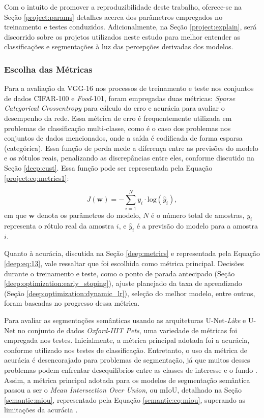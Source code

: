 Com o intuito de promover a reproduzibilidade deste trabalho, oferece-se na Seção \ref{project:params} detalhes acerca dos parâmetros empregados no treinamento e testes conduzidos. Adicionalmente, na Seção \ref{project:explain}, será discorrido sobre os projetos utilizados neste estudo para melhor entender as classificações e segmentações à luz das percepções derivadas dos modelos.

\subsubsection{Escolha das Métricas}
\label{project:metrics}
Para a avaliação da VGG-16 nos processos de treinamento e teste nos conjuntos de dados CIFAR-100 e \textit{Food}-101, foram empregadas duas métricas: \textit{Sparse Categorical Crossentropy} para cálculo do erro e acurácia para avaliar o desempenho da rede. Essa métrica de erro é frequentemente utilizada em problemas de classificação multi-classe, como é o caso dos problemas nos conjuntos de dados mencionados, onde a saída é codificada de forma esparsa (categórica). Essa função de perda mede a diferença entre as previsões do modelo e os rótulos reais, penalizando as discrepâncias entre eles, conforme discutido na Seção \ref{deep:cust}. Essa função pode ser representada pela Equação \ref{project:eq:metrics1}:

\begin{equation}
    \label{project:eq:metrics1}
    J(\boldsymbol{w}) = - \sum_{i=1}^{N} y_i \cdot \text{log}(\hat{y}_i),
\end{equation}
em que $\boldsymbol{w}$ denota os parâmetros do modelo, $N$ é o número total de amostras, $y_i$ representa o rótulo real da amostra $i$, e $\hat{y}_i$ é a previsão do modelo para a amostra $i$.

Quanto à acurácia, discutida na Seção \ref{deep:metrics} e representada pela Equação \ref{deep:eq:13}, vale ressaltar que foi escolhida como métrica principal. Decisões durante o treinamento e teste, como o ponto de parada antecipado (Seção \ref{deep:optimization:early_stoping}), ajuste planejado da taxa de aprendizado (Seção \ref{deep:optimization:dynamic_lr}), seleção do melhor modelo, entre outros, foram baseadas no progresso dessa métrica.

Para avaliar as segmentações semânticas usando as arquiteturas U-Net-\textit{Like} e U-Net no conjunto de dados \textit{Oxford-IIIT Pets}, uma variedade de métricas foi empregada nos testes. Inicialmente, a métrica principal adotada foi a acurácia, conforme utilizado nos testes de classificação. Entretanto, o uso da métrica de acurácia é desencorajado para problemas de segmentação, já que muitos desses problemas podem enfrentar desequilíbrios entre as classes de interesse e o fundo \citep{Muller2022TowardsSegmentation}. Assim, a métrica principal adotada para os modelos de segmentação semântica passou a ser o \textit{Mean Intersection Over Union}, ou mIoU, detalhado na Seção \ref{semantic:miou}, representado pela Equação \ref{semantic:eq:miou}, superando as limitações da acurácia \citep{Muller2022TowardsSegmentation}.

